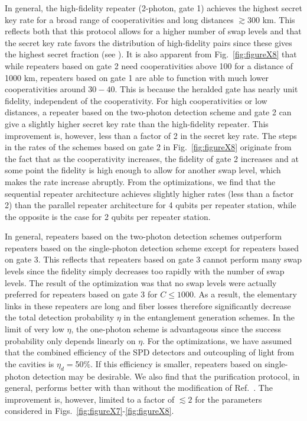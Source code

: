 In general, the high-fidelity repeater (2-photon, gate 1) achieves the highest
secret key rate for a broad range of cooperativities and long distances $\gtrsim
300$ km. This reflects both that this protocol allows for a higher number of
swap levels and that the secret key rate favors the distribution of
high-fidelity pairs since these gives the highest secret fraction (see
). It is also apparent from Fig.~\ref{fig:figureX8} that
while repeaters based on gate 2 need cooperativities above 100 for a distance of
1000 km, repeaters based on gate 1 are able to function with much lower
cooperativities around $30-40$. This is because the heralded gate has nearly
unit fidelity, independent of the cooperativity. For high cooperativities or
low distances, a repeater based on the two-photon detection scheme and gate 2
can give a slightly higher secret key rate than the high-fidelity repeater. This
improvement is, however, less than a factor of 2 in the secret key rate. The
steps in the rates of the schemes based on gate 2 in Fig.~\ref{fig:figureX8}
originate from the fact that as the cooperativity increases, the fidelity of
gate 2 increases and at some point the fidelity is high enough to allow for
another swap level, which makes the rate increase abruptly.
From the optimizations, we find that the sequential repeater architecture
achieves slightly higher rates (less than a factor 2) than the parallel repeater
architecture for 4 qubits per repeater station, while the opposite is the case
for 2 qubits per repeater station.

In general, repeaters based on the two-photon detection schemes outperform
repeaters based on the single-photon detection scheme except for repeaters based
on gate 3. This reflects that repeaters based on gate 3 cannot perform many swap
levels since the fidelity simply decreases too rapidly with the number of swap
levels. The result of the optimization was that no swap levels were actually
preferred for repeaters based on gate 3 for $C\leq1000$.  As a result, the
elementary links in these repeaters are long and fiber losses therefore
significantly decrease the total detection probability $\eta$ in the
entanglement generation schemes. In the limit of very low $\eta$, the one-photon
scheme is advantageous since the success probability only depends linearly on
$\eta$. For the optimizations, we have assumed that the combined efficiency of
the SPD detectors and outcoupling of light from the cavities is $\eta_{d}=$50\%.
If this efficiency is smaller, repeaters based on single-photon detection may be
desirable. We also find that the purification protocol, in general, performs
better with than without the modification of Ref.~\cite{nickerson}. The
improvement is, however, limited to a factor of $\lesssim2$ for the parameters
considered in Figs.~\ref{fig:figureX7}-\ref{fig:figureX8}.

